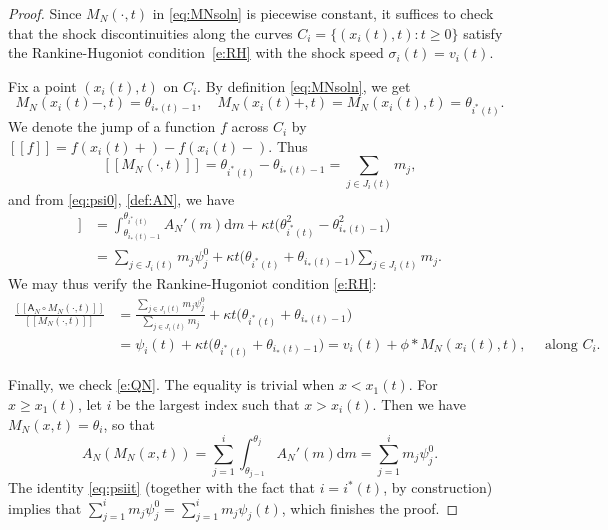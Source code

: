 \documentclass[11pt,reqno]{amsart}
\theoremstyle{definition}
\theoremstyle{remark}
\def\dd{\mathrm{d}}
\def\A{\mathsf{A}}
\def\s{\sigma}
\begin{document}
	\begin{proof}
		Since $M_N(\cdot, t)$ in \eqref{eq:MNsoln} is piecewise constant, it suffices to check that the shock discontinuities along the curves $C_i = \{(x_i(t), t):t\ge 0\}$ satisfy the Rankine-Hugoniot condition~\eqref{e:RH} with the shock speed $\s_i(t)=v_i(t)$.
		
		Fix a point $(x_i(t), t)$ on $C_i$. By definition \eqref{eq:MNsoln}, we get 
		\[
		M_N(x_i(t)-,t) = \theta_{i_*(t)-1},\quad M_N(x_i(t)+,t)=M_N(x_i(t),t)=\theta_{i^*(t)}.
		\]
		We denote the jump of a function $f$ across $C_i$ by $[[f]] = f(x_i(t)+) - f(x_i(t)-)$. Thus
		\[
		[[M_N(\cdot, t)]] = \theta_{i^*(t)}-\theta_{i_*(t)-1}=\sum_{j\in J_i(t)} m_j,
		\]
		and from \eqref{eq:psi0}, \eqref{def:AN}, we have
		\begin{align*}
			[[ \A_N ( M_N(\cdot, t),t)]] & = 
			\int_{\theta_{i_*(t)-1}}^{\theta_{i^*(t)}} A_N'(m)\dd m + \kappa t \big(\theta_{i^*(t)}^2-\theta_{i_*(t)-1}^2\big)\\ 
			& = \sum_{j\in J_i(t)} m_j \psi_j^0 + \kappa t \big(\theta_{i^*(t)}+\theta_{i_*(t)-1}\big) \sum_{j\in J_i(t)} m_j.
		\end{align*}
		We may thus verify the Rankine-Hugoniot condition \eqref{e:RH}:
		\begin{align*}
			\frac{[[\A_N\circ M_N(\cdot, t)]]}{[[M_N(\cdot, t)]]} & = \frac{\sum_{j\in J_i(t)} m_j \psi_j^0}{\sum_{j\in J_i(t)} m_j} + \kappa t \big(\theta_{i^*(t)}+\theta_{i_*(t)-1}\big)\\
			& = \psi_i(t) + \kappa t \big(\theta_{i^*(t)}+\theta_{i_*(t)-1}\big) = v_i(t) + \phi\ast M_N(x_i(t),t), \quad \text{ along }C_i.
		\end{align*}
		
		
		
		Finally, we check \eqref{e:QN}. The equality is trivial when $x<x_1(t)$. For $x\ge x_1(t)$, let $i$ be the largest index such that $x>x_i(t)$.  Then we have $M_N(x,t)=\theta_i$, so that
		\[
		A_N(M_N(x,t))=\sum_{j=1}^i\int_{\theta_{j-1}}^{\theta_j}A_N'(m)\dd m
		=\sum_{j=1}^im_j\psi_j^0.
		\]
		The identity \eqref{eq:psiit} (together with the fact that $i = i^*(t)$, by construction) implies that
		$\sum_{j=1}^im_j\psi_j^0=\sum_{j=1}^i m_j\psi_j(t)$, which finishes the proof.
	\end{proof}

	
	
\end{document}
